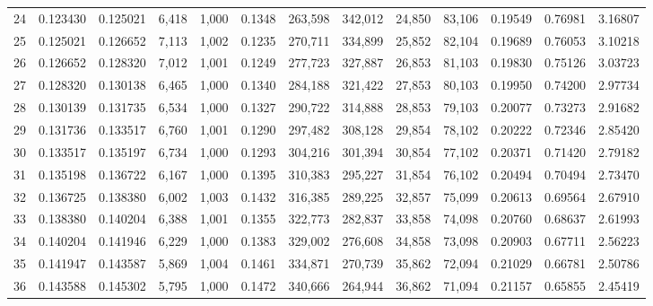 \begin{tabular}{rrrrrrrrrrrrr}
24  &  0.123430 &  0.125021 &   6,418 &  1,000 &                                     0.1348 &  263,598 &  342,012 &   24,850 &   83,106 &  0.19549 &  0.76981 &  3.16807 \\
25  &  0.125021 &  0.126652 &   7,113 &  1,002 &                                     0.1235 &  270,711 &  334,899 &   25,852 &   82,104 &  0.19689 &  0.76053 &  3.10218 \\
26  &  0.126652 &  0.128320 &   7,012 &  1,001 &                                     0.1249 &  277,723 &  327,887 &   26,853 &   81,103 &  0.19830 &  0.75126 &  3.03723 \\
27  &  0.128320 &  0.130138 &   6,465 &  1,000 &                                     0.1340 &  284,188 &  321,422 &   27,853 &   80,103 &  0.19950 &  0.74200 &  2.97734 \\
28  &  0.130139 &  0.131735 &   6,534 &  1,000 &                                     0.1327 &  290,722 &  314,888 &   28,853 &   79,103 &  0.20077 &  0.73273 &  2.91682 \\
29  &  0.131736 &  0.133517 &   6,760 &  1,001 &                                     0.1290 &  297,482 &  308,128 &   29,854 &   78,102 &  0.20222 &  0.72346 &  2.85420 \\
30  &  0.133517 &  0.135197 &   6,734 &  1,000 &                                     0.1293 &  304,216 &  301,394 &   30,854 &   77,102 &  0.20371 &  0.71420 &  2.79182 \\
31  &  0.135198 &  0.136722 &   6,167 &  1,000 &                                     0.1395 &  310,383 &  295,227 &   31,854 &   76,102 &  0.20494 &  0.70494 &  2.73470 \\
32  &  0.136725 &  0.138380 &   6,002 &  1,003 &                                     0.1432 &  316,385 &  289,225 &   32,857 &   75,099 &  0.20613 &  0.69564 &  2.67910 \\
33  &  0.138380 &  0.140204 &   6,388 &  1,001 &                                     0.1355 &  322,773 &  282,837 &   33,858 &   74,098 &  0.20760 &  0.68637 &  2.61993 \\
34  &  0.140204 &  0.141946 &   6,229 &  1,000 &                                     0.1383 &  329,002 &  276,608 &   34,858 &   73,098 &  0.20903 &  0.67711 &  2.56223 \\
35  &  0.141947 &  0.143587 &   5,869 &  1,004 &                                     0.1461 &  334,871 &  270,739 &   35,862 &   72,094 &  0.21029 &  0.66781 &  2.50786 \\
36  &  0.143588 &  0.145302 &   5,795 &  1,000 &                                     0.1472 &  340,666 &  264,944 &   36,862 &   71,094 &  0.21157 &  0.65855 &  2.45419 \\

\end{tabular}
